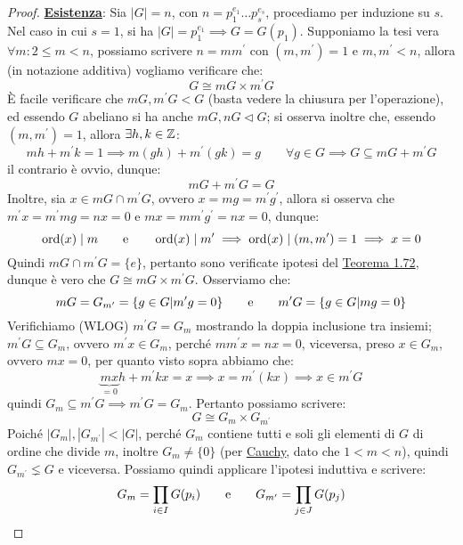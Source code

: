 \documentclass[11pt]{scrartcl}
\begin{document}
\begin{proof}
    \underline{\textbf{Esistenza}}: Sia $|G| = n$, con $n = p_1^{e_1} \ldots p_s^{e_s}$, procediamo per induzione su $s$. Nel caso in cui $s = 1$, si ha $|G| = p_1^{e_1} \implies G = G(p_1)$. Supponiamo 
    la tesi vera $\forall m : 2 \leq m < n$, possiamo scrivere $n = m m^{\prime}$ con $(m,m^{\prime}) = 1$ e $m,m^{\prime} < n$, allora (in notazione additiva) vogliamo verificare che:
        \[ G \cong mG \times m^{\prime}G
            \]
        È facile verificare che $mG,m^{\prime}G < G$ (basta vedere la chiusura per l'operazione), ed essendo $G$ abeliano si ha anche $mG,nG \triangleleft G$; si osserva inoltre che, essendo $(m,m^{\prime}) = 1$, allora $\exists h,k \in \mathbb Z$:
            \[ mh + m^{\prime}k = 1 \implies m(gh) + m^{\prime}(gk) = g \qquad \forall g \in G \implies G \subseteq mG + m^{\prime}G
                \]
        il contrario è ovvio, dunque:
            \[ mG + m^{\prime}G = G
                \]
        Inoltre, sia $x \in mG \cap m^{\prime}G$, ovvero $x = mg = m^{\prime}g^{\prime}$, allora si osserva che $m^{\prime}x = m^{\prime}mg = nx = 0$ e $mx = mm^{\prime}g^{\prime} = nx = 0$, dunque:
            \[ \operatorname{ord}(x) \mid m \qquad \text e \qquad \operatorname{ord}(x) \mid m^{\prime} \implies \operatorname{ord}(x) \mid (m,m^{\prime}) = 1 \implies x = 0
                \]
        Quindi $mG \cap m^{\prime}G = \{e\}$, pertanto sono verificate ipotesi del \hyperref[t:1.72]{Teorema 1.72}, dunque è vero che $G \cong mG \times m^{\prime}G$. Osserviamo che:
            \[ mG = G_{m^{\prime}} = \{g \in G | m^{\prime}g = 0\} \qquad \text e \qquad m^{\prime}G = \{g \in G | mg = 0\}
                \]
        Verifichiamo (WLOG) $m^{\prime}G = G_m$ mostrando la doppia inclusione tra insiemi; $m^{\prime}G \subseteq G_m$, ovvero $m^{\prime}x \in G_m$, perché $mm^{\prime}x = nx = 0$, viceversa, preso 
        $x \in G_m$, ovvero $mx = 0$, per quanto visto sopra abbiamo che:
            \[ \underbrace{mx}_{= 0}h + m^{\prime}kx = x \implies x = m^{\prime}(kx) \implies x \in m^{\prime}G
                \]
        quindi $G_m \subseteq m^{\prime}G \implies m^{\prime}G = G_m$. Pertanto possiamo scrivere:
            \[ G \cong G_m \times G_{m^\prime}
                \]
        Poiché $|G_m|,|G_{m^\prime}| < |G|$, perché $G_m$ contiene tutti e soli gli elementi di $G$ di ordine che divide $m$, inoltre $G_m \ne \{0\}$ (per \hyperref[p:Cauchy]{Cauchy}, dato che $1 < m < n$),
        quindi $G_{m^{\prime}} \lneq G$ e viceversa. Possiamo quindi applicare l'ipotesi induttiva e scrivere:
            \[ G_m = \prod_{i \in I}G(p_i) \qquad \text e \qquad G_{m^{\prime}} = \prod_{j \in J}G(p_j)
\]
\end{proof}
\end{document}
